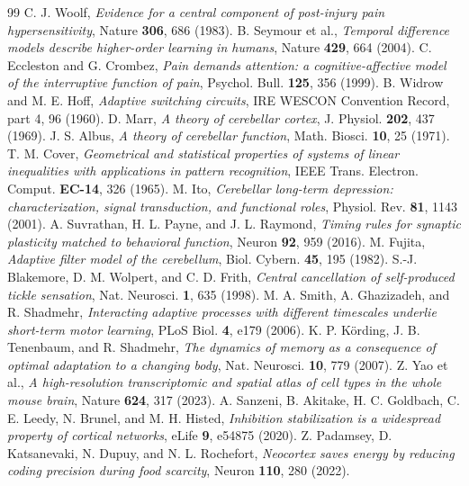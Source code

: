 \begin{thebibliography}{99}
 C. J. Woolf, \emph{Evidence for a central component of post-injury pain hypersensitivity}, Nature \textbf{306}, 686 (1983).
 B. Seymour et al., \emph{Temporal difference models describe higher-order learning in humans}, Nature \textbf{429}, 664 (2004).
 C. Eccleston and G. Crombez, \emph{Pain demands attention: a cognitive-affective model of the interruptive function of pain}, Psychol. Bull. \textbf{125}, 356 (1999).
 B. Widrow and M. E. Hoff, \emph{Adaptive switching circuits}, IRE WESCON Convention Record, part 4, 96 (1960).
 D. Marr, \emph{A theory of cerebellar cortex}, J. Physiol. \textbf{202}, 437 (1969).
 J. S. Albus, \emph{A theory of cerebellar function}, Math. Biosci. \textbf{10}, 25 (1971).
 T. M. Cover, \emph{Geometrical and statistical properties of systems of linear inequalities with applications in pattern recognition}, IEEE Trans. Electron. Comput. \textbf{EC-14}, 326 (1965).
 M. Ito, \emph{Cerebellar long-term depression: characterization, signal transduction, and functional roles}, Physiol. Rev. \textbf{81}, 1143 (2001).
 A. Suvrathan, H. L. Payne, and J. L. Raymond, \emph{Timing rules for synaptic plasticity matched to behavioral function}, Neuron \textbf{92}, 959 (2016).
 M. Fujita, \emph{Adaptive filter model of the cerebellum}, Biol. Cybern. \textbf{45}, 195 (1982).
 S.-J. Blakemore, D. M. Wolpert, and C. D. Frith, \emph{Central cancellation of self-produced tickle sensation}, Nat. Neurosci. \textbf{1}, 635 (1998).
 M. A. Smith, A. Ghazizadeh, and R. Shadmehr, \emph{Interacting adaptive processes with different timescales underlie short-term motor learning}, PLoS Biol. \textbf{4}, e179 (2006).
 K. P. K\"ording, J. B. Tenenbaum, and R. Shadmehr, \emph{The dynamics of memory as a consequence of optimal adaptation to a changing body}, Nat. Neurosci. \textbf{10}, 779 (2007).
 Z. Yao et al., \emph{A high-resolution transcriptomic and spatial atlas of cell types in the whole mouse brain}, Nature \textbf{624}, 317 (2023).
 A. Sanzeni, B. Akitake, H. C. Goldbach, C. E. Leedy, N. Brunel, and M. H. Histed, \emph{Inhibition stabilization is a widespread property of cortical networks}, eLife \textbf{9}, e54875 (2020).
 Z. Padamsey, D. Katsanevaki, N. Dupuy, and N. L. Rochefort, \emph{Neocortex saves energy by reducing coding precision during food scarcity}, Neuron \textbf{110}, 280 (2022).

\end{thebibliography}
